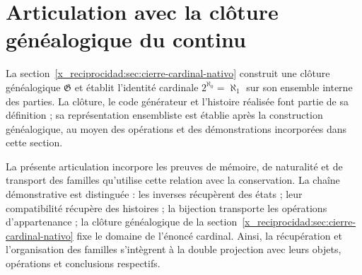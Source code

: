 \section{Articulation avec la clôture généalogique du continu}
La section~\ref{x_reciprocidad:sec:cierre-cardinal-nativo} construit une clôture
généalogique \(\mathfrak G\) et établit l’identité cardinale
\(2^{\aleph_0}=\aleph_1\) sur son ensemble interne des parties. La clôture,
le code générateur et l’histoire réalisée font partie de sa
définition ; sa représentation ensembliste est établie après la
construction généalogique, au moyen des opérations et des démonstrations
incorporées dans cette section.

La présente articulation incorpore les preuves de mémoire, de naturalité et de transport des familles qu'utilise cette relation avec la conservation. La chaîne démonstrative est distinguée : les inverses récupèrent des états ; leur compatibilité récupère des histoires ; la bijection transporte les opérations d'appartenance ; la clôture généalogique de la section~\ref{x_reciprocidad:sec:cierre-cardinal-nativo} fixe le domaine de l'énoncé cardinal. Ainsi, la récupération et l'organisation des familles s'intègrent à la double projection avec leurs objets, opérations et conclusions respectifs.
